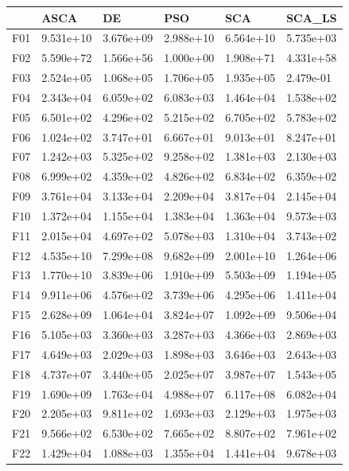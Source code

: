\begin{tabular}{llllll}
\toprule
{} &       ASCA &         DE &        PSO &        SCA &     SCA\_LS \\
\midrule
F01  &  9.531e+10 &  3.676e+09 &  2.988e+10 &  6.564e+10 &  5.735e+03 \\
F02  &  5.590e+72 &  1.566e+56 &  1.000e+00 &  1.908e+71 &  4.331e+58 \\
F03  &  2.524e+05 &  1.068e+05 &  1.706e+05 &  1.935e+05 &  2.479e-01 \\
F04  &  2.343e+04 &  6.059e+02 &  6.083e+03 &  1.464e+04 &  1.538e+02 \\
F05  &  6.501e+02 &  4.296e+02 &  5.215e+02 &  6.705e+02 &  5.783e+02 \\
F06  &  1.024e+02 &  3.747e+01 &  6.667e+01 &  9.013e+01 &  8.247e+01 \\
F07  &  1.242e+03 &  5.325e+02 &  9.258e+02 &  1.381e+03 &  2.130e+03 \\
F08  &  6.999e+02 &  4.359e+02 &  4.826e+02 &  6.834e+02 &  6.359e+02 \\
F09  &  3.761e+04 &  3.133e+04 &  2.209e+04 &  3.817e+04 &  2.145e+04 \\
F10  &  1.372e+04 &  1.155e+04 &  1.383e+04 &  1.363e+04 &  9.573e+03 \\
F11  &  2.015e+04 &  4.697e+02 &  5.078e+03 &  1.310e+04 &  3.743e+02 \\
F12  &  4.535e+10 &  7.299e+08 &  9.682e+09 &  2.001e+10 &  1.264e+06 \\
F13  &  1.770e+10 &  3.839e+06 &  1.910e+09 &  5.503e+09 &  1.194e+05 \\
F14  &  9.911e+06 &  4.576e+02 &  3.739e+06 &  4.295e+06 &  1.411e+04 \\
F15  &  2.628e+09 &  1.064e+04 &  3.824e+07 &  1.092e+09 &  9.506e+04 \\
F16  &  5.105e+03 &  3.360e+03 &  3.287e+03 &  4.366e+03 &  2.869e+03 \\
F17  &  4.649e+03 &  2.029e+03 &  1.898e+03 &  3.646e+03 &  2.643e+03 \\
F18  &  4.737e+07 &  3.440e+05 &  2.025e+07 &  3.987e+07 &  1.543e+05 \\
F19  &  1.690e+09 &  1.763e+04 &  4.988e+07 &  6.117e+08 &  6.082e+04 \\
F20  &  2.205e+03 &  9.811e+02 &  1.693e+03 &  2.129e+03 &  1.975e+03 \\
F21  &  9.566e+02 &  6.530e+02 &  7.665e+02 &  8.807e+02 &  7.961e+02 \\
F22  &  1.429e+04 &  1.088e+03 &  1.355e+04 &  1.441e+04 &  9.678e+03 \\

\end{tabular}
